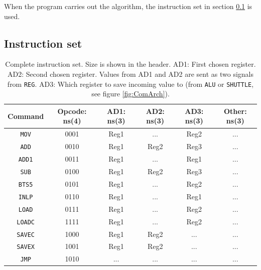 When the program carries out the algorithm, the  instruction set in section \ref{sec:instructionSet} is used.

\subsection{Instruction set}
\label{sec:instructionSet}

\begin{table}[H]
    \begin{center}
    \begin{tabular}{|c||c|c|c|c|c|}
        \hline
        \textbf{Command} & \textbf{Opcode: ns(4)} & \textbf{AD1: ns(3)} & \textbf{AD2: ns(3)} & \textbf{AD3: ns(3)} & \textbf{Other: ns(3)} \\ \hline \hline
        \texttt{MOV}     & 0001          & Reg1       & ...        & Reg2       & ...          \\ \hline
        \texttt{ADD}     & 0010          & Reg1       & Reg2       & Reg3       & ...          \\ \hline
        \texttt{ADD1}    & 0011          & Reg1       & ...        & Reg1       & ...          \\ \hline
        \texttt{SUB}     & 0100          & Reg1       & Reg2       & Reg3       & ...          \\ \hline
        \texttt{BTS5}    & 0101          & Reg1       & ...        & Reg2       & ...          \\ \hline
        \texttt{INLP}    & 0110          & Reg1       & ...        & Reg1       & ...          \\ \hline
        \texttt{LOAD}    & 0111          & Reg1       & ...        & Reg2       & ...          \\ \hline
        \texttt{LOADC}   & 1111          & Reg1       & ...        & Reg2       & ...          \\ \hline
        \texttt{SAVEC}   & 1000          & Reg1       & Reg2       & ...        & ...          \\ \hline
        \texttt{SAVEX}   & 1001          & Reg1       & Reg2       & ...        & ...          \\ \hline
        \texttt{JMP}     & 1010          & ...        & ...        & ...        & ...          \\ \hline
    \end{tabular}
    \caption{Complete instruction set. Size is shown in the header. AD1: First chosen register. AD2: Second chosen register. Values from AD1 and AD2 are sent as two signals from \texttt{REG}. AD3: Which register to save incoming value to (from \texttt{ALU} or \texttt{SHUTTLE}, see figure \ref{fig:ComArch}).}
    \label{table:InstructionSet}
    \end{center}
\end{table}

